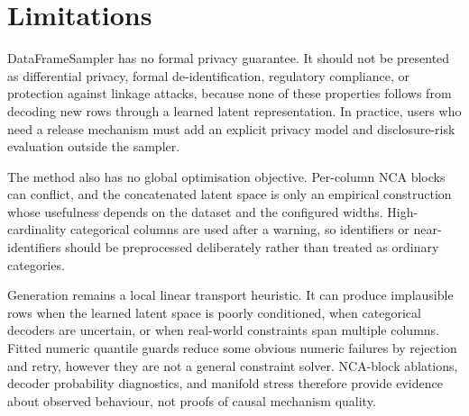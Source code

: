 \section{Limitations}

DataFrameSampler has no formal privacy guarantee. It should not be presented as
differential privacy, formal de-identification, regulatory compliance, or
protection against linkage attacks, because none of these properties follows
from decoding new rows through a learned latent representation. In practice,
users who need a release mechanism must add an explicit privacy model and
disclosure-risk evaluation outside the sampler.

The method also has no global optimisation objective. Per-column NCA blocks can
conflict, and the concatenated latent space is only an empirical construction
whose usefulness depends on the dataset and the configured widths. High-cardinality
categorical columns are used after a warning, so identifiers or near-identifiers
should be preprocessed deliberately rather than treated as ordinary categories.

Generation remains a local linear transport heuristic. It can produce
implausible rows when the learned latent space is poorly conditioned, when
categorical decoders are uncertain, or when real-world constraints span
multiple columns. Fitted numeric quantile guards reduce some obvious numeric
failures by rejection and retry, however they are not a general constraint
solver. NCA-block ablations, decoder probability diagnostics,
and manifold stress therefore provide evidence about observed behaviour, not
proofs of causal mechanism quality.


